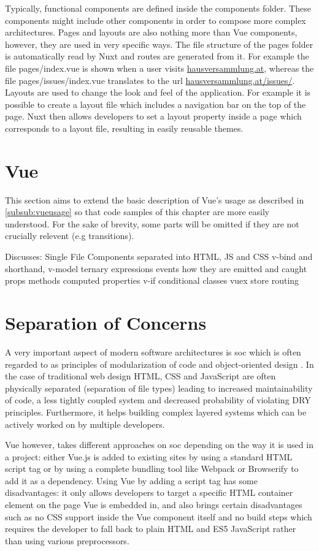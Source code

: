 Typically, functional components are defined inside the components folder. These components might include other components in order to compose more complex architectures. Pages and layouts are also nothing more than Vue components, however, they are used in very specific ways. The file structure of the pages folder is automatically read by Nuxt and routes are generated from it. For example the file pages/index.vue is shown when a user visits \url{hausversammlung.at}, whereas the file pages/issues/index.vue translates to the url \url{hausversammlung.at/issues/}. Layouts are used to change the look and feel of the application. For example it is possible to create a layout file which includes a navigation bar on the top of the page. Nuxt then allows developers to set a layout property inside a page which corresponds to a layout file, resulting in easily reusable themes. 

\section{Vue}
This section aims to extend the basic description of Vue's usage as described in \autoref{subsub:vueusage} so that code samples of this chapter are more easily understood. For the sake of brevity, some parts will be omitted if they are not crucially relevent (e.g transitions). 

Discusses:
Single File Components separated into HTML, JS and CSS
v-bind and shorthand, v-model
ternary expressions
events how they are emitted and caught
props
methods
computed properties
v-if 
conditional classes 
vuex store
routing

\section{Separation of Concerns}
A very important aspect of modern software architectures is \acrfull{soc} which is often regarded to as principles of modularization of code and object-oriented design \cite{laplante2007every:book}. In the case of traditional web design HTML, CSS and JavaScript are often physically separated (separation of file types) leading to increased maintainability of code, a less tightly coupled system and decreased probability of violating DRY principles. Furthermore, it helps building complex layered systems which can be actively worked on by multiple developers. 

Vue however, takes different approaches on \acrshort{soc} depending on the way it is used in a project:
either Vue.js is added to existing sites by using a standard HTML script tag or by using a complete bundling tool like Webpack or Browserify to add it as a dependency. Using Vue by adding a script tag has some disadvantages: it only allows developers to target a specific HTML container element on the page Vue is embedded in, and also brings certain disadvantages such as no CSS support inside the Vue component itself and no build steps which requires the developer to fall back to plain HTML and ES5 JavaScript rather than using various preprocessors.

